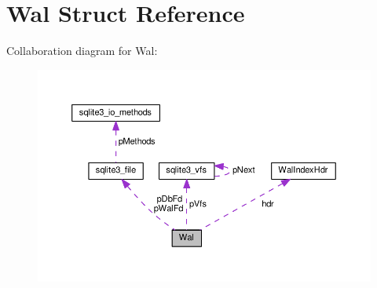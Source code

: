 \hypertarget{structWal}{}\section{Wal Struct Reference}
\label{structWal}


Collaboration diagram for Wal\+:\nopagebreak
\begin{figure}[H]
\begin{center}
\leavevmode
\includegraphics[width=350pt]{structWal__coll__graph}
\end{center}
\end{figure}
